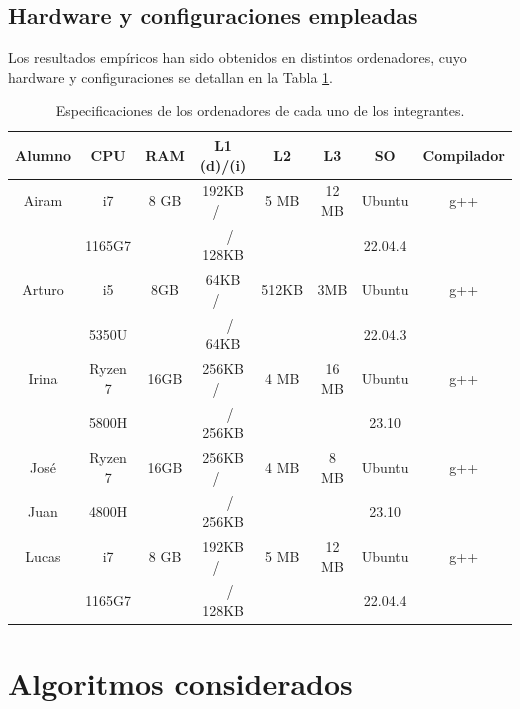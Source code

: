 \documentclass[12pt]{article}
\begin{document}
    \subsection{Hardware y configuraciones empleadas}
    Los resultados empíricos han sido obtenidos en distintos ordenadores, cuyo hardware y configuraciones se detallan en la Tabla \ref{tab:Hware_Especificaciones}.
    \begin{table}
        \centering
        \begin{tabular}{|c||c|c|c|c|c|c|c|}
            \hline
            Alumno & CPU & RAM & L1 (d)/(i) & L2 & L3 & SO & Compilador \\
            \hline \hline
            Airam & i7 & 8 GB & 192KB /~~ & 5 MB & 12 MB & Ubuntu & g++ \\
            & 1165G7 & & ~~/ 128KB & & & 22.04.4 & \\
             \hline
            Arturo & i5 & 8GB &64KB /~~ &512KB & 3MB&Ubuntu & g++ \\
            & 5350U & & ~~/ 64KB & & &22.04.3 & \\
            \hline
            Irina & Ryzen 7 & 16GB & 256KB /~~ & 4 MB & 16 MB & Ubuntu & g++ \\
            & 5800H & & ~~/ 256KB& & & 23.10 & \\
            \hline
            José & Ryzen 7 & 16GB & 256KB /~~ & 4 MB & 8 MB & Ubuntu & g++ \\
            Juan & 4800H & & ~~/ 256KB & & & 23.10 & \\
            \hline
            Lucas & i7 & 8 GB & 192KB /~~ & 5 MB & 12 MB & Ubuntu & g++ \\
            & 1165G7 & & ~~/ 128KB & & & 22.04.4 & \\
            \hline
        \end{tabular}
        \caption{Especificaciones de los ordenadores de cada uno de los integrantes.}
        \label{tab:Hware_Especificaciones}
    \end{table}
    
    \section{Algoritmos considerados}
    
\end{document}

